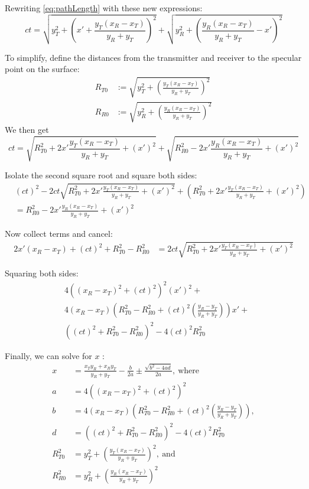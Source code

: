 \documentclass{article}
\begin{document}
Rewriting \eqref{eq:pathLength} with these new expressions:
\begin{equation*}
   ct = \sqrt{y_T^2 + \left(x' + \frac{y_T(x_R-x_T)}{y_R+y_T}\right)^2} + \sqrt{y_R^2
      + \left(\frac{y_R(x_R-x_T)}{y_R+y_T} - x'\right)^2}
\end{equation*}

To simplify, define the distances from the transmitter and receiver to the specular
point on the surface:
\begin{align*}
   R_{T0} &:= \sqrt{y_T^2 + \left(\frac{y_T(x_R-x_T)}{y_R+y_T}\right)^2} \\
   R_{R0} &:= \sqrt{y_R^2 + \left(\frac{y_R(x_R-x_T)}{y_R+y_T}\right)^2}
\end{align*}
We then get 
\begin{equation*}
   ct = \sqrt{R_{T0}^2 + 2x' \frac{y_T(x_R-x_T)}{y_R+y_T} + (x')^2} + \sqrt{R_{R0}^2
      - 2x' \frac{y_R(x_R-x_T)}{y_R+y_T} + (x')^2}
\end{equation*}

Isolate the second square root and square both sides:
\begin{align*}
   &(ct)^2 - 2ct \sqrt{R_{T0}^2 + 2x' \frac{y_T(x_R-x_T)}{y_R+y_T} + (x')^2} +
      \left(R_{T0}^2 + 2x' \frac{y_T(x_R-x_T)}{y_R+y_T} + (x')^2\right) \\
   &= R_{R0}^2 - 2x' \frac{y_R(x_R-x_T)}{y_R+y_T} + (x')^2
\end{align*}

Now collect terms and cancel:
\begin{align*}
   2x'(x_R-x_T) + (ct)^2 + R_{T0}^2 - R_{R0}^2 &= 2ct \sqrt{R_{T0}^2 + 2x'
      \frac{y_T(x_R-x_T)}{y_R+y_T} + (x')^2}
\end{align*}

Squaring both sides: 
\begin{align*}
   &4\left( (x_R - x_T)^2 + (ct)^2 \right)^2 (x')^2 + \\
   &4(x_R - x_T) \left( R_{T0}^2 - R_{R0}^2 + (ct)^2 \left( \frac{y_R - y_T}{y_R +
      y_T} \right) \right) x' + \\ 
   & \left( (ct)^2 + R_{T0}^2 - R_{R0}^2 \right)^2 - 4(ct)^2 R_{T0}^2
\end{align*}

Finally, we can solve for $x$ :
\begin{align} 
   x &= \frac{x_T y_R + x_R y_T}{y_R + y_T} - \frac{b}{2a} \pm \frac{\sqrt{b^2 -
      4ad}}{2a}, \ \text{where} \\
   a &= 4\left( (x_R - x_T)^2 + (ct)^2 \right)^2 \nonumber \\
   b &= 4(x_R - x_T) \left( R_{T0}^2 - R_{R0}^2 + (ct)^2 \left( \frac{y_R - y_T}{y_R +
      y_T} \right) \right), \nonumber \\
   d &= \left( (ct)^2 + R_{T0}^2 - R_{R0}^2 \right)^2 - 4(ct)^2 R_{T0}^2 \nonumber \\
   R^2_{T0} &= y_T^2 + \left(\frac{y_T(x_R-x_T)}{y_R+y_T}\right)^2, \ \text{and}
      \nonumber \\ 
   R^2_{R0} &= y_R^2 + \left(\frac{y_R(x_R-x_T)}{y_R+y_T}\right)^2 \nonumber
\end{align}
\newpage
\end{document}
